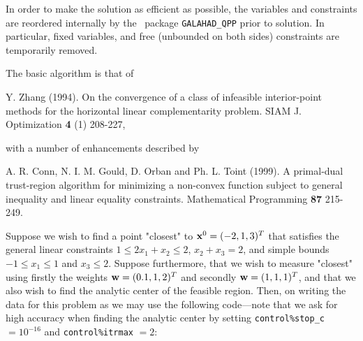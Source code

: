 \documentclass{galahad}
\begin{document}
In order to make the solution as efficient as possible, the 
variables and constraints are reordered internally
by the \galahad\ package {\tt GALAHAD\_QPP} prior to solution. 
In particular, fixed variables, and 
free (unbounded on both sides) constraints are temporarily removed.
\vspace*{1mm}

\galreferences
\vspace*{1mm}

\noindent
The basic algorithm is that of
\vspace*{1mm}

\noindent
Y. Zhang (1994).
On the convergence of a class of infeasible interior-point methods for the
horizontal linear complementarity problem.
SIAM J. Optimization {\bf 4} (1) 208-227,
\vspace*{1mm}

\noindent
with a number of enhancements described by
\vspace*{1mm}

\noindent
A. R. Conn, N. I. M. Gould, D. Orban and Ph. L. Toint (1999).
A primal-dual trust-region algorithm for minimizing a non-convex 
function subject to general inequality and linear equality constraints.
Mathematical Programming {\bf 87} 215-249.


\galexample
Suppose we wish to find a point "closest" to
${\mathbf{x}}^{0}  =  ( -2, 1, 3 )^{T}$
that satisfies the general linear constraints
$1 \leq  2 x_{1}  +  x_{2}  \leq  2$, 
$x_{2}  +  x_{3}  =  2$, and simple bounds
$-1  \leq  x_{1}  \leq  1$ and $x_{3}  \leq  2$.
Suppose furthermore, that we wish to measure "closest" using
firstly the weights ${\mathbf{w}}  =  ( 0.1, 1, 2 )^{T}$
and secondly ${\mathbf{w}}  =  ( 1, 1, 1 )^{T}$, and that we also
wish to find the analytic center of the feasible region.
Then, on writing the data for this problem as
we may use the following code---note that we ask for high accuracy
when finding the analytic center by setting
{\tt control\%stop\_c} $= 10^{-16}$ and {\tt control\%itrmax} $= 2$:
\end{document}
